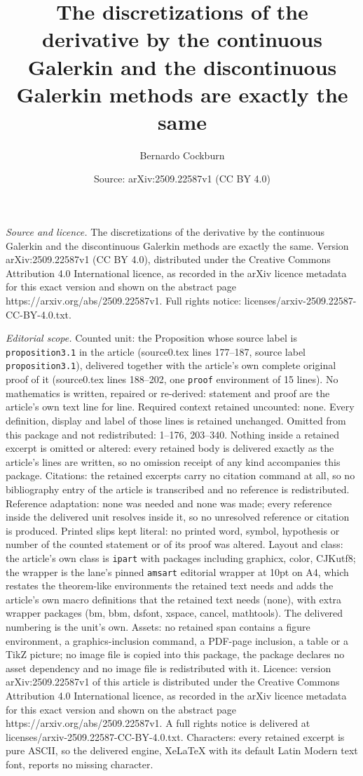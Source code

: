 \documentclass[10pt,a4paper]{amsart}
\title[The discretizations of the derivative by the continuous Gale]{The discretizations of the derivative by the continuous Galerkin and the discontinuous Galerkin methods are exactly the same}
\author{Bernardo Cockburn}
\date{Source: arXiv:2509.22587v1 (CC BY 4.0)}
\begin{document}
\maketitle

\noindent\emph{Source and licence.} The discretizations of the derivative by the continuous Galerkin and the discontinuous Galerkin methods are exactly the same. Version arXiv:2509.22587v1 (CC BY 4.0), distributed under the Creative Commons Attribution 4.0 International licence, as recorded in the arXiv licence metadata for this exact version and shown on the abstract page https://arxiv.org/abs/2509.22587v1. Full rights notice: licenses/arxiv-2509.22587-CC-BY-4.0.txt.\par\smallskip

\noindent\textit{Editorial scope.} Counted unit: the Proposition whose source label is \texttt{proposition3.1} in the article (source0.tex lines 177--187, source label \texttt{proposition3.1}), delivered together with the article's own complete original proof of it (source0.tex lines 188--202, one \texttt{proof} environment of 15 lines). No mathematics is written, repaired or re-derived: statement and proof are the article's own text line for line. Required context retained uncounted: none. Every definition, display and label of those lines is retained unchanged. Omitted from this package and not redistributed: 1--176, 203--340. Nothing inside a retained excerpt is omitted or altered: every retained body is delivered exactly as the article's lines are written, so no omission receipt of any kind accompanies this package. Citations: the retained excerpts carry no citation command at all, so no bibliography entry of the article is transcribed and no reference is redistributed. Reference adaptation: none was needed and none was made; every reference inside the delivered unit resolves inside it, so no unresolved reference or citation is produced. Printed slips kept literal: no printed word, symbol, hypothesis or number of the counted statement or of its proof was altered. Layout and class: the article's own class is \texttt{ipart} with packages including graphicx, color, CJKutf8; the wrapper is the lane's pinned \texttt{amsart} editorial wrapper at 10pt on A4, which restates the theorem-like environments the retained text needs and adds the article's own macro definitions that the retained text needs (none), with extra wrapper packages (bm, bbm, dsfont, xspace, cancel, mathtools). The delivered numbering is the unit's own. Assets: no retained span contains a figure environment, a graphics-inclusion command, a PDF-page inclusion, a table or a TikZ picture; no image file is copied into this package, the package declares no asset dependency and no image file is redistributed with it. Licence: version arXiv:2509.22587v1 of this article is distributed under the Creative Commons Attribution 4.0 International licence, as recorded in the arXiv licence metadata for this exact version and shown on the abstract page https://arxiv.org/abs/2509.22587v1. A full rights notice is delivered at licenses/arxiv-2509.22587-CC-BY-4.0.txt. Characters: every retained excerpt is pure ASCII, so the delivered engine, XeLaTeX with its default Latin Modern text font, reports no missing character.
\end{document}
